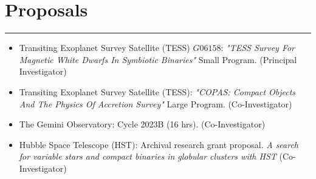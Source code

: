 \documentclass[letterpaper,10pt]{article}
\begin{document}
\begin{comment}
\subsection*{Media Coverage}

\begin{itemize}[label=$\blacktriangleright$]

\item \hyperref[https://phys.org/news/2017-03-planetary-earth-sun.html]{Planetary waves, first found on Earth, are discovered on Sun (phys.org)}

\end{itemize}
\end{comment}
\section*{Proposals}       

\hrule
\vspace{.3 cm}



\begin{itemize}[label=$\blacktriangleright$]
      \item   Transiting Exoplanet Survey Satellite (TESS) $G06158$: \emph{"TESS Survey For Magnetic White Dwarfs In Symbiotic Binaries"} Small Program. (Principal Investigator)
  \end{itemize}


\begin{itemize}[label=$\blacktriangleright$]
      \item   Transiting Exoplanet Survey Satellite (TESS): \emph{"COPAS: Compact Objects And The Physics Of Accretion Survey"} Large Program. (Co-Investigator)
  \end{itemize}

\begin{itemize}[label=$\blacktriangleright$]
      \item   The Gemini Observatory:  Cycle 2023B (16 hrs). (Co-Investigator)
  \end{itemize}




  \begin{itemize}[label=$\blacktriangleright$]
      \item Hubble Space Telescope (HST):  Archival research grant proposal. \emph{A search for variable stars and compact binaries in globular clusters with HST } (Co-Investigator)
  \end{itemize}
  
\end{document}
